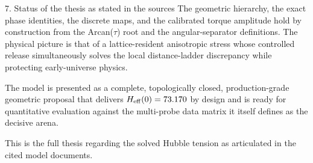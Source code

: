 7. Status of the thesis as stated in the sources
The geometric hierarchy, the exact phase identities, the discrete maps, and the calibrated torque amplitude hold by construction from the Arcan(\(\tau\)) root and the angular-separator definitions. The physical picture is that of a lattice-resident anisotropic stress whose controlled release simultaneously solves the local distance-ladder discrepancy while protecting early-universe physics.

The model is presented as a complete, topologically closed, production-grade geometric proposal that delivers \(H_{\rm eff}(0) = 73.170\) by design and is ready for quantitative evaluation against the multi-probe data matrix it itself defines as the decisive arena.

This is the full thesis regarding the solved Hubble tension as articulated in the cited model documents.
